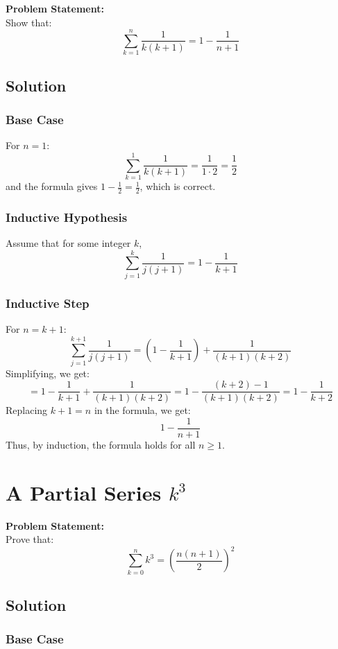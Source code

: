 \documentclass[10pt]{article}
\begin{document}
\textbf{Problem Statement:} \\
Show that:
\[
\sum_{k=1}^n \frac{1}{k(k+1)} = 1 - \frac{1}{n+1}
\]

\subsection{Solution}

\subsubsection{Base Case}

For \( n = 1 \):
\[
\sum_{k=1}^1 \frac{1}{k(k+1)} = \frac{1}{1 \cdot 2} = \frac{1}{2}
\]
and the formula gives \( 1 - \frac{1}{2} = \frac{1}{2} \), which is correct.

\subsubsection{Inductive Hypothesis}

Assume that for some integer \( k \),
\[
\sum_{j=1}^k \frac{1}{j(j+1)} = 1 - \frac{1}{k+1}
\]

\subsubsection{Inductive Step}

For \( n = k+1 \):
\[
\sum_{j=1}^{k+1} \frac{1}{j(j+1)} = \left(1 - \frac{1}{k+1}\right) + \frac{1}{(k+1)(k+2)}
\]
Simplifying, we get:
\[
= 1 - \frac{1}{k+1} + \frac{1}{(k+1)(k+2)} = 1 - \frac{(k+2) - 1}{(k+1)(k+2)} = 1 - \frac{1}{k+2}
\]
Replacing \( k+1 = n\) in the formula, we get:
\[
1 - \frac{1}{n+1}
\]
Thus, by induction, the formula holds for all \( n \geq 1 \).

\newpage

\section{A Partial Series \(k^3\)}

\textbf{Problem Statement:} \\
Prove that:
\[
\sum_{k=0}^n k^3 = \left(\frac{n(n+1)}{2}\right)^2
\]

\subsection{Solution}

\subsubsection{Base Case}
\end{document}
